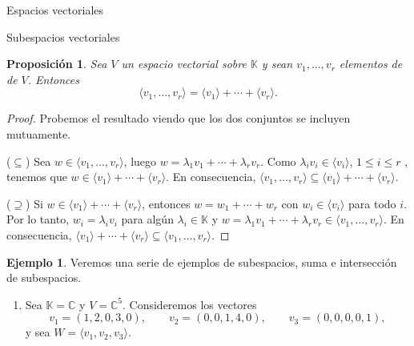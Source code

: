 \documentclass[a4paper,12pt,twoside,spanish,reqno]{amsbook}
\newtheorem{proposicion}[teorema]{Proposici\'on}
\theoremstyle{definition}
\newtheorem{ejemplo}{Ejemplo}[section]
\theoremstyle{remark}
\newcommand{\C}{\mathbb C}
\newcommand{\K}{\mathbb K}
\begin{document}
\begin{chapter}{Espacios vectoriales}
\begin{section}{Subespacios vectoriales}
    \begin{proposicion}
        Sea $V$ un espacio vectorial sobre $\K$ y sean $v_1,\ldots,v_r$ elementos de   de $V$. Entonces
        \begin{equation*}
            \langle v_1,\ldots,v_r \rangle = \langle v_1 \rangle+ \cdots + \langle v_r \rangle.
        \end{equation*}
    \end{proposicion}
    \begin{proof}
        Probemos el resultado viendo que los dos conjuntos se incluyen mutuamente.
        
        ($\subseteq$) Sea $w \in \langle v_1,\ldots,v_r \rangle$, luego $w = \lambda_1 v_1 +\cdots+ \lambda_r v_r$. Como $ \lambda_i v_i \in \langle v_i \rangle$, $1 \le i \le r$ ,  tenemos que  $w \in \langle v_1 \rangle+ \cdots + \langle v_r \rangle$.  En  consecuencia, $\langle v_1,\ldots,v_r \rangle \subseteq \langle v_1 \rangle+ \cdots + \langle v_r \rangle$. 
        
        ($\supseteq$) Si $w \in \langle v_1 \rangle+ \cdots + \langle v_r \rangle$, entonces $w = w_1 + \cdots+w_r$ con $w_i \in \langle v_i\rangle$ para todo $i$. Por lo tanto, $w_i = \lambda_i v_i$ para algún $\lambda_i \in \K$ y  $w = \lambda_1 v_1 +\cdots+ \lambda_r v_r \in \langle v_1,\ldots,v_r \rangle $. En  consecuencia, $\langle v_1 \rangle+ \cdots + \langle v_r \rangle \subseteq \langle v_1,\ldots,v_r \rangle$. 
    \end{proof}



        



    \begin{ejemplo}\label{ejemplos2} Veremos una serie de ejemplos de subespacios,  suma e intersección de subespacios.
        \begin{enumerate}
            \item\label{ejemplos2-1} Sea $\K = \C$ y $V= \C^5$. Consideremos los vectores
            \begin{equation*}
                v_1 = (1,2,0,3,0), \qquad v_2 = (0,0,1,4,0), \qquad v_3 = (0,0,0,0,1),
            \end{equation*}
            y sea $W= \langle v_1,v_2,v_3 \rangle$. 
            

\end{enumerate}
\end{ejemplo}
\end{section}
\end{chapter}
\end{document}
